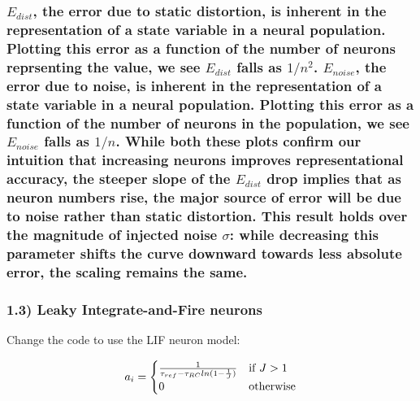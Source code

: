 \documentclass{article}
\begin{document}
    \subsubsection{$E_{dist}$, the error due to static distortion, is
inherent in the representation of a state variable in a neural
population. Plotting this error as a function of the number of neurons
reprsenting the value, we see $E_{dist}$ falls as $1/n^2$. $E_{noise}$,
the error due to noise, is inherent in the representation of a state
variable in a neural population. Plotting this error as a function of
the number of neurons in the population, we see $E_{noise}$ falls as
$1/n$. While both these plots confirm our intuition that increasing
neurons improves representational accuracy, the steeper slope of the
$E_{dist}$ drop implies that as neuron numbers rise, the major source of
error will be due to noise rather than static distortion. This result
holds over the magnitude of injected noise $\sigma$: while decreasing
this parameter shifts the curve downward towards less absolute error,
the scaling remains the
same.}\label{eux5fdist-the-error-due-to-static-distortion-is-inherent-in-the-representation-of-a-state-variable-in-a-neural-population.-plotting-this-error-as-a-function-of-the-number-of-neurons-reprsenting-the-value-we-see-eux5fdist-falls-as-1n2.-eux5fnoise-the-error-due-to-noise-is-inherent-in-the-representation-of-a-state-variable-in-a-neural-population.-plotting-this-error-as-a-function-of-the-number-of-neurons-in-the-population-we-see-eux5fnoise-falls-as-1n.-while-both-these-plots-confirm-our-intuition-that-increasing-neurons-improves-representational-accuracy-the-steeper-slope-of-the-eux5fdist-drop-implies-that-as-neuron-numbers-rise-the-major-source-of-error-will-be-due-to-noise-rather-than-static-distortion.-this-result-holds-over-the-magnitude-of-injected-noise-sigma-while-decreasing-this-parameter-shifts-the-curve-downward-towards-less-absolute-error-the-scaling-remains-the-same.}

    \subsubsection{1.3) Leaky Integrate-and-Fire
neurons}\label{leaky-integrate-and-fire-neurons}

Change the code to use the LIF neuron model:

\[
a_i = \begin{cases}
    {1 \over {\tau_{ref}-\tau_{RC}ln(1-{1 \over J})}} &\mbox{if } J>1 \\ 
    0 &\mbox{otherwise} 
    \end{cases}
\]
\end{document}
